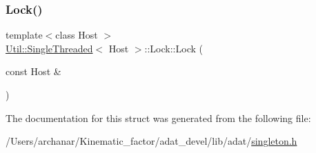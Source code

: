 \subsubsection{\texorpdfstring{Lock()}{Lock()}\hspace{0.1cm}{\footnotesize\ttfamily [4/4]}}
{\footnotesize\ttfamily template$<$class Host $>$ \\
\mbox{\hyperlink{classUtil_1_1SingleThreaded}{Util\+::\+Single\+Threaded}}$<$ Host $>$\+::Lock\+::\+Lock (\begin{DoxyParamCaption}\item[{const Host \&}]{ }\end{DoxyParamCaption})\hspace{0.3cm}{\ttfamily [inline]}}



The documentation for this struct was generated from the following file\+:\begin{DoxyCompactItemize}
\item 
/\+Users/archanar/\+Kinematic\+\_\+factor/adat\+\_\+devel/lib/adat/\mbox{\hyperlink{lib_2adat_2singleton_8h}{singleton.\+h}}\end{DoxyCompactItemize}
